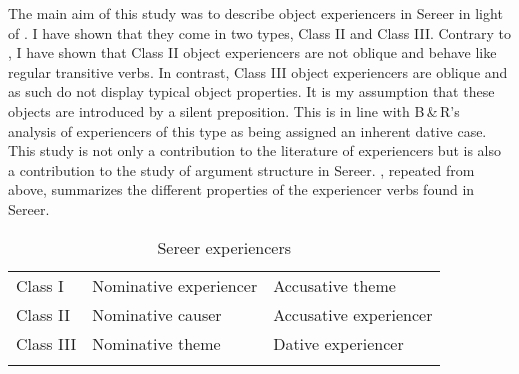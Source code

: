 \documentclass[output=paper]{langscibook}
\begin{document}
The main aim of this study was to describe object experiencers in Sereer in light of \citet{Belletti1988}.  I have shown that they come in two types, Class II and Class III. Contrary to \citet{Landau2010}, I have shown that Class II object experiencers are not oblique and behave like regular transitive verbs. In contrast, Class III object experiencers are oblique and as such do not display typical object properties. It is my assumption that these objects are introduced by a silent preposition. This is in line with B\,\&\,R's analysis of experiencers of this type as being assigned an inherent dative case. This study is not only a contribution to the literature of experiencers but is also a contribution to the study of argument structure in Sereer. , repeated from above, summarizes the different properties of the experiencer verbs found in Sereer.

\begin{table}
\caption{\label{tab:tamba:3}Sereer experiencers}
\begin{tabular}{lll}
\lsptoprule
{Class I} & Nominative experiencer & Accusative theme\\
{Class II} & Nominative causer & Accusative experiencer\\
{Class III} & Nominative theme & Dative experiencer\\
\lspbottomrule
\end{tabular}
\end{table}

 






\end{document}
